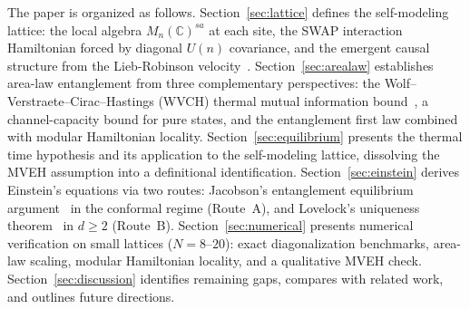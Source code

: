 The paper is organized as follows. Section~\ref{sec:lattice} defines the
self-modeling lattice: the local algebra $M_n(\mathbb{C})^{sa}$ at each
site, the SWAP interaction Hamiltonian forced by diagonal $U(n)$
covariance, and the emergent causal structure from the Lieb-Robinson
velocity~\cite{LiebRobinson1972, NachtergaeleSims2006}.
Section~\ref{sec:arealaw} establishes area-law entanglement from three
complementary perspectives: the Wolf--Verstraete--Cirac--Hastings (WVCH)
thermal mutual information bound~\cite{WVCH2008}, a channel-capacity
bound for pure states, and the entanglement first law combined with
modular Hamiltonian locality. Section~\ref{sec:equilibrium} presents the
thermal time hypothesis and its application to the self-modeling lattice,
dissolving the MVEH assumption into a definitional identification.
Section~\ref{sec:einstein} derives Einstein's equations via two routes:
Jacobson's entanglement equilibrium argument~\cite{Jacobson2016} in the
conformal regime (Route~A), and Lovelock's uniqueness
theorem~\cite{Lovelock1971} in $d \geq 2$ (Route~B).
Section~\ref{sec:numerical} presents numerical verification on small
lattices ($N = 8$--$20$): exact diagonalization benchmarks, area-law
scaling, modular Hamiltonian locality, and a qualitative MVEH check.
Section~\ref{sec:discussion} identifies remaining gaps, compares with
related work, and outlines future directions.
